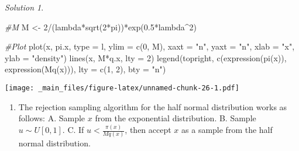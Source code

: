 \documentclass[
]{book}
\newenvironment{Shaded}{\begin{snugshade}}{\end{snugshade}}
\newcommand{\AttributeTok}[1]{\textcolor[rgb]{0.77,0.63,0.00}{#1}}
\newcommand{\CommentTok}[1]{\textcolor[rgb]{0.56,0.35,0.01}{\textit{#1}}}
\newcommand{\DecValTok}[1]{\textcolor[rgb]{0.00,0.00,0.81}{#1}}
\newcommand{\FloatTok}[1]{\textcolor[rgb]{0.00,0.00,0.81}{#1}}
\newcommand{\FunctionTok}[1]{\textcolor[rgb]{0.00,0.00,0.00}{#1}}
\newcommand{\NormalTok}[1]{#1}
\newcommand{\OtherTok}[1]{\textcolor[rgb]{0.56,0.35,0.01}{#1}}
\newcommand{\SpecialCharTok}[1]{\textcolor[rgb]{0.00,0.00,0.00}{#1}}
\newcommand{\StringTok}[1]{\textcolor[rgb]{0.31,0.60,0.02}{#1}}
\providecommand{\tightlist}{%
  \setlength{\itemsep}{0pt}\setlength{\parskip}{0pt}}
\theoremstyle{definition}
\theoremstyle{definition}
\theoremstyle{definition}
\theoremstyle{definition}
\theoremstyle{remark}
\newtheorem*{solution}{Solution}
\begin{document}
\begin{solution}
\begin{Shaded}
\begin{Highlighting}[]
\CommentTok{\#M}
\NormalTok{M }\OtherTok{\textless{}{-}} \DecValTok{2}\SpecialCharTok{/}\NormalTok{(lambda}\SpecialCharTok{*}\FunctionTok{sqrt}\NormalTok{(}\DecValTok{2}\SpecialCharTok{*}\NormalTok{pi))}\SpecialCharTok{*}\FunctionTok{exp}\NormalTok{(}\FloatTok{0.5}\SpecialCharTok{*}\NormalTok{lambda}\SpecialCharTok{\^{}}\DecValTok{2}\NormalTok{)}

\CommentTok{\#Plot}
\FunctionTok{plot}\NormalTok{(x, pi.x, }\AttributeTok{type =} \StringTok{\textquotesingle{}l\textquotesingle{}}\NormalTok{, }\AttributeTok{ylim =} \FunctionTok{c}\NormalTok{(}\DecValTok{0}\NormalTok{, M), }\AttributeTok{xaxt =} \StringTok{"n"}\NormalTok{, }\AttributeTok{yaxt =} \StringTok{"n"}\NormalTok{, }\AttributeTok{xlab =} \StringTok{"x"}\NormalTok{, }\AttributeTok{ylab =} \StringTok{"density"}\NormalTok{)}
\FunctionTok{lines}\NormalTok{(x, M}\SpecialCharTok{*}\NormalTok{q.x, }\AttributeTok{lty =} \DecValTok{2}\NormalTok{)}
\FunctionTok{legend}\NormalTok{(}\StringTok{\textquotesingle{}topright\textquotesingle{}}\NormalTok{, }\FunctionTok{c}\NormalTok{(}\FunctionTok{expression}\NormalTok{(}\FunctionTok{pi}\NormalTok{(x)), }\FunctionTok{expression}\NormalTok{(}\FunctionTok{Mq}\NormalTok{(x))), }\AttributeTok{lty =} \FunctionTok{c}\NormalTok{(}\DecValTok{1}\NormalTok{, }\DecValTok{2}\NormalTok{), }\AttributeTok{bty =} \StringTok{"n"}\NormalTok{)}
\end{Highlighting}
\end{Shaded}

\texttt{[image: \_main\_files/figure-latex/unnamed-chunk-26-1.pdf]}

\begin{enumerate}
\def\labelenumi{\arabic{enumi}.}
\setcounter{enumi}{2}
\tightlist
\item
  The rejection sampling algorithm for the half normal distribution works as follows:
  A. Sample \(x\) from the exponential distribution.
  B. Sample \(u \sim U[0, 1]\).
  C. If \(u < \frac{\pi(x)}{Mq(x)}\), then accept \(x\) as a sample from the half normal distribution.
\end{enumerate}

\end{solution}
\end{document}

